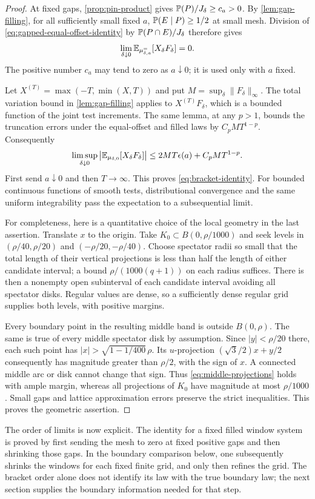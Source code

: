 \begin{proof}
At fixed gaps, \cref{prop:pin-product} gives
$\mathbb P(P)/J_\delta\ge c_a>0$.  By
\cref{lem:gap-filling}, for all sufficiently small fixed $a$,
$\mathbb P(E\mid P)\ge1/2$ at small mesh.  Division of
\eqref{eq:gapped-equal-offset-identity} by
$\mathbb P(P\cap E)/J_\delta$ therefore gives
\begin{equation}\label{eq:conditional-gapped-identity}
 \lim_{\delta\downarrow0}
    \mathbb E_{\mu^{=}_{\delta,a}}[X_\delta F_\delta]=0.
\end{equation}
The positive number $c_a$ may tend to zero as $a\downarrow0$;
it is used only with $a$ fixed.

Let $X^{(T)}=\max(-T,\min(X,T))$ and put
$M=\sup_\delta\|F_\delta\|_\infty$.  The total variation bound
in \cref{lem:gap-filling} applies to $X^{(T)}F_\delta$, which
is a bounded function of the joint test increments.  The same
lemma, at any $p>1$, bounds the truncation errors under the
equal-offset and filled laws by $C_pM T^{1-p}$.  Consequently
\[
 \limsup_{\delta\downarrow0}
 \left|\mathbb E_{\mu_{\delta,0}}[X_\delta F_\delta]\right|
 \le 2MT\epsilon(a)+C_pM T^{1-p}.
\]
First send $a\downarrow0$ and then $T\to\infty$.  This proves
\eqref{eq:bracket-identity}.  For bounded continuous functions
of smooth tests, distributional convergence and the same
uniform integrability pass the expectation to a subsequential
limit.

For completeness, here is a quantitative choice of the local
geometry in the last assertion.  Translate $x$ to the origin.
Take $K_0\subset B(0,\rho/1000)$ and seek levels in
$(\rho/40,\rho/20)$ and $(-\rho/20,-\rho/40)$.
Choose spectator radii so small that the total length of their
vertical projections is less than half the length of either
candidate interval; a bound $\rho/(1000(q+1))$ on each radius
suffices.  There is then a nonempty open subinterval of each
candidate interval avoiding all spectator disks.  Regular values
are dense, so a sufficiently dense regular grid supplies both
levels, with positive margins.

Every boundary point in the resulting middle band is outside
$B(0,\rho)$.  The same is true of every middle spectator disk
by assumption.  Since $|y|<\rho/20$ there, each such point has
$|x|>\sqrt{1-1/400}\,\rho$.  Its $u$-projection
$(\sqrt3/2)x+y/2$ consequently has magnitude greater than
$\rho/2$, with the sign of $x$.  A connected middle arc or
disk cannot change that sign.  Thus
\eqref{eq:middle-projections} holds with ample margin, whereas
all projections of $K_0$ have magnitude at most $\rho/1000$.
Small gaps and lattice approximation errors preserve the
strict inequalities.  This proves the geometric assertion.
\end{proof}

The order of limits is now explicit.  The identity for a fixed
filled window system is proved by first sending the mesh to
zero at fixed positive gaps and then shrinking those gaps.
In the boundary comparison below, one subsequently shrinks
the windows for each fixed finite grid, and only then refines
the grid.  The bracket order alone does not identify its law
with the true boundary law; the next section supplies the
boundary information needed for that step.
